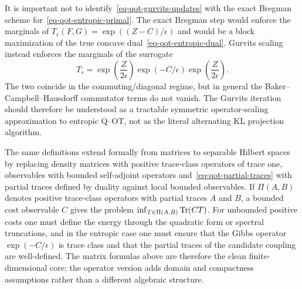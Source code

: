 \begin{rem}
	It is important not to identify~\eqref{eq-qot-gurvits-updates} with the exact Bregman scheme for~\eqref{eq-qot-entropic-primal}. The exact Bregman step would enforce the marginals of $T_e(F,G)=\exp((Z-C)/\epsilon)$ and would be a block maximization of the true concave dual~\eqref{eq-qot-entropic-dual}. Gurvits scaling instead enforces the marginals of the surrogate
\[
	T_s=
	\exp\!\left(\frac{Z}{2\epsilon}\right)
	\exp(-C/\epsilon)
	\exp\!\left(\frac{Z}{2\epsilon}\right).
\]
	The two coincide in the commuting/diagonal regime, but in general the Baker--Campbell--Hausdorff commutator terms do not vanish. The Gurvits iteration should therefore be understood as a tractable symmetric operator-scaling approximation to entropic Q--OT, not as the literal alternating KL projection algorithm.
\end{rem}

\begin{rem}
	The same definitions extend formally from matrices to separable Hilbert spaces by replacing density matrices with positive trace-class operators of trace one, observables with bounded self-adjoint operators and~\eqref{eq-qot-partial-traces} with partial traces defined by duality against local bounded observables. If $\Pi(A,B)$ denotes positive trace-class operators with partial traces $A$ and $B$, a bounded cost observable $C$ gives the problem $\inf_{T\in\Pi(A,B)}\operatorname{Tr}(CT)$. For unbounded positive costs one must define the energy through the quadratic form or spectral truncations, and in the entropic case one must ensure that the Gibbs operator $\exp(-C/\epsilon)$ is trace class and that the partial traces of the candidate coupling are well-defined. The matrix formulas above are therefore the clean finite-dimensional core; the operator version adds domain and compactness assumptions rather than a different algebraic structure.
\end{rem}
